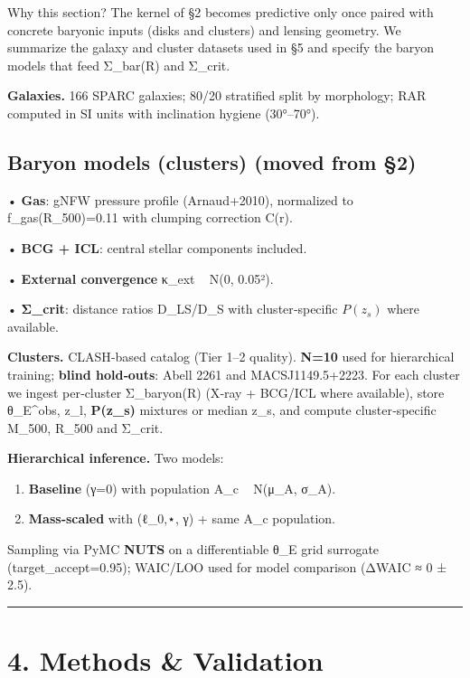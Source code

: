\documentclass[11pt,a4paper]{article}
\begin{document}
Why this section? The kernel of §2 becomes predictive only once paired with concrete baryonic inputs (disks and clusters) and lensing geometry. We summarize the galaxy and cluster datasets used in §5 and specify the baryon models that feed Σ\_bar(R) and Σ\_crit.


\textbf{Galaxies.} 166 SPARC galaxies; 80/20 stratified split by morphology; RAR computed in SI units with inclination hygiene (30°–70°).


\subsection{Baryon models (clusters) (moved from §2)}


• \textbf{Gas}: gNFW pressure profile (Arnaud+2010), normalized to f\_gas(R\_500)=0.11 with clumping correction C(r).  

• \textbf{BCG + ICL}: central stellar components included.  

• \textbf{External convergence} κ\_ext ~ N(0, 0.05²).  

• \textbf{Σ\_crit}: distance ratios D\_LS/D\_S with cluster‑specific $P(z_s)$ where available.


\textbf{Clusters.} CLASH‑based catalog (Tier 1–2 quality). \textbf{N=10} used for hierarchical training; \textbf{blind hold‑outs}: Abell 2261 and MACSJ1149.5+2223. For each cluster we ingest per‑cluster Σ\_baryon(R) (X‑ray + BCG/ICL where available), store {θ\_E^obs, z\_l, \textbf{P(z\_s)} mixtures or median z\_s}, and compute cluster‑specific M\_500, R\_500 and Σ\_crit.


\textbf{Hierarchical inference.} Two models:  

\begin{enumerate}
\item \textbf{Baseline} (γ=0) with population A\_c ~ N(μ\_A, σ\_A).
\item \textbf{Mass‑scaled} with (ℓ\_{0,⋆}, γ) + same A\_c population.
\end{enumerate}

Sampling via PyMC \textbf{NUTS} on a differentiable θ\_E grid surrogate (target\_accept=0.95); WAIC/LOO used for model comparison (ΔWAIC ≈ 0 ± 2.5).


\medskip\hrule\medskip


\section{4. Methods \& Validation}
\end{document}
